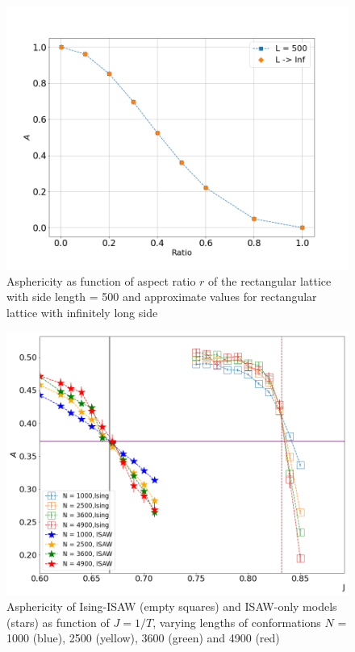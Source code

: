 \documentclass[aps,pre,amssymb,amsmath,twocolumn,floatfix]{revtex4-2}
\begin{document}
\begin{figure}[h]
    \centering
    \includegraphics[width=\columnwidth]{Images/A_r.png}
    \caption{Asphericity as function of aspect ratio $r$ of the rectangular lattice with side length = 500 and approximate values for rectangular lattice with infinitely long side}
    \label{fig:A_r}
\end{figure}


\begin{figure}[h!]
    \centering
    \includegraphics[width=\columnwidth]{Images/Ising_ISAW_A_J_Full.png}
    \caption{Asphericity of Ising-ISAW (empty squares) and ISAW-only models (stars) as function of $J=1/T$, varying lengths of conformations $N$ = 1000 (blue), 2500 (yellow), 3600 (green) and 4900 (red)}
    \label{fig:Ising&ISAW_A_J}
\end{figure}
\end{document}
